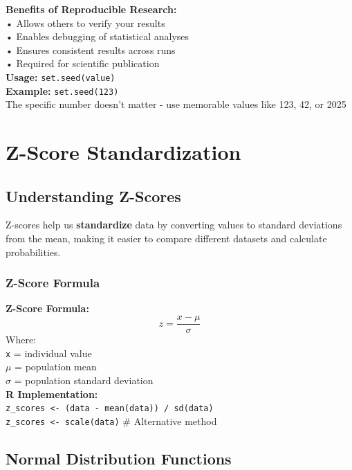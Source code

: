 \documentclass[11pt,a4paper]{article}
\begin{document}
\begin{formulabox}
\textbf{Benefits of Reproducible Research:}\\
• Allows others to verify your results\\
• Enables debugging of statistical analyses\\
• Ensures consistent results across runs\\
• Required for scientific publication\\[0.3cm]
\textbf{Usage:} \texttt{set.seed(value)}\\
\textbf{Example:} \texttt{set.seed(123)}\\
The specific number doesn't matter - use memorable values like 123, 42, or 2025
\end{formulabox}

\section{Z-Score Standardization}

\subsection{Understanding Z-Scores}

Z-scores help us \textbf{standardize} data by converting values to standard deviations from the mean, making it easier to compare different datasets and calculate probabilities.

\subsubsection{Z-Score Formula}

\begin{formulabox}
\textbf{Z-Score Formula:}
$$z = \frac{x - \mu}{\sigma}$$
Where:\\
\texttt{x} = individual value\\
\texttt{$\mu$} = population mean\\
\texttt{$\sigma$} = population standard deviation\\[0.3cm]
\textbf{R Implementation:}\\
\texttt{z\_scores <- (data - mean(data)) / sd(data)}\\
\texttt{z\_scores <- scale(data)} \# Alternative method
\end{formulabox}

\subsection{Normal Distribution Functions}
\end{document}

